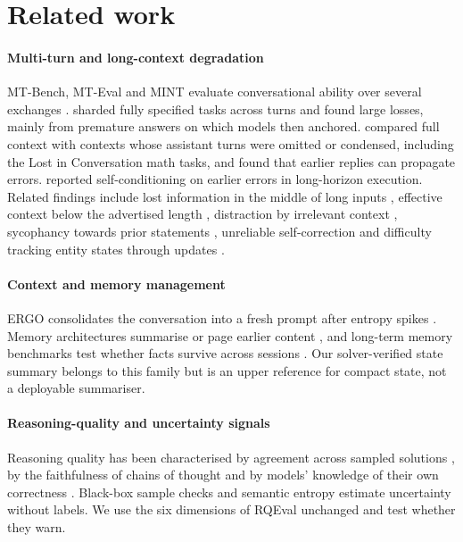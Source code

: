 \section{Related work}
\label{sec:related}

\paragraph{Multi-turn and long-context degradation}
MT-Bench, MT-Eval and MINT evaluate conversational ability over several
exchanges \citep{zheng2023judging,kwan2024mteval,wang2024mint}.
\citet{laban2025lost} sharded fully specified tasks across turns and found
large losses, mainly from premature answers on which models then anchored.
\citet{huang2026benefit} compared full context with contexts whose assistant
turns were omitted or condensed, including the Lost in Conversation math tasks,
and found that earlier replies can propagate errors. \citet{sinha2025illusion}
reported self-conditioning on earlier errors in long-horizon execution.
Related findings include lost information in the middle of long inputs
\citep{liu2024lost}, effective context below the advertised length
\citep{hsieh2024ruler}, distraction by irrelevant context
\citep{shi2023distracted}, sycophancy towards prior statements
\citep{sharma2024sycophancy}, unreliable self-correction \citep{huang2024cannot}
and difficulty tracking entity states through updates \citep{kim2023entity}.

\paragraph{Context and memory management}
ERGO consolidates the conversation into a fresh prompt after entropy spikes
\citep{khalid2025ergo}. Memory architectures summarise or page earlier content
\citep{packer2023memgpt,zhong2024memorybank,wang2023recursive}, and long-term
memory benchmarks test whether facts survive across sessions
\citep{maharana2024locomo,wu2025longmemeval}. Our solver-verified state summary
belongs to this family but is an upper reference for compact state, not a
deployable summariser.

\paragraph{Reasoning-quality and uncertainty signals}
Reasoning quality has been characterised by agreement across sampled solutions
\citep{wang2023selfconsistency}, by the faithfulness of chains of thought
\citep{wei2022chain,turpin2023say,lanham2023measuring} and by models' knowledge
of their own correctness \citep{kadavath2022know}. Black-box sample checks
\citep{manakul2023selfcheckgpt} and semantic entropy
\citep{farquhar2024detecting} estimate uncertainty without labels. We use the
six dimensions of RQEval \citep{rqeval2026} unchanged and test whether they
warn.

